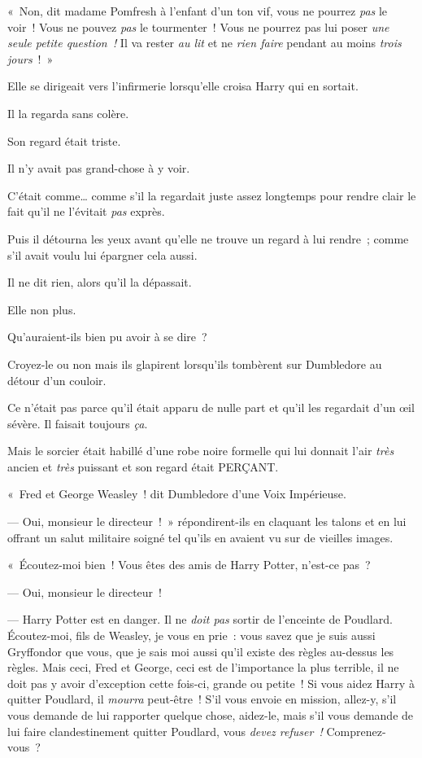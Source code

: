 
«~Non, dit madame Pomfresh à l'enfant d'un ton vif, vous ne pourrez \emph{pas} le voir~! Vous ne pouvez \emph{pas} le tourmenter~! Vous ne pourrez pas lui poser \emph{une seule petite question~!} Il va rester \emph{au lit} et ne \emph{rien faire} pendant au moins \emph{trois jours}~!~»


Elle se dirigeait vers l'infirmerie lorsqu'elle croisa Harry qui en sortait.

Il la regarda sans colère.

Son regard était triste.

Il n'y avait pas grand-chose à y voir.

C'était comme… comme s'il la regardait juste assez longtemps pour rendre clair le fait qu'il ne l'évitait \emph{pas} exprès.

Puis il détourna les yeux avant qu'elle ne trouve un regard à lui rendre~; comme s'il avait voulu lui épargner cela aussi.

Il ne dit rien, alors qu'il la dépassait.

Elle non plus.

Qu'auraient-ils bien pu avoir à se dire~?


Croyez-le ou non mais ils glapirent lorsqu'ils tombèrent sur Dumbledore au détour d'un couloir.

Ce n'était pas parce qu'il était apparu de nulle part et qu'il les regardait d'un œil sévère. Il faisait toujours \emph{ça}.

Mais le sorcier était habillé d’une robe noire formelle qui lui donnait l'air \emph{très} ancien et \emph{très} puissant et son regard était PERÇANT.

«~Fred et George Weasley~! dit Dumbledore d'une Voix Impérieuse.

--- Oui, monsieur le directeur~!~» répondirent-ils en claquant les talons et en lui offrant un salut militaire soigné tel qu'ils en avaient vu sur de vieilles images.

«~Écoutez-moi bien~! Vous êtes des amis de Harry Potter, n'est-ce pas~?

--- Oui, monsieur le directeur~!

--- Harry Potter est en danger. Il ne \emph{doit pas} sortir de l'enceinte de Poudlard. Écoutez-moi, fils de Weasley, je vous en prie~: vous savez que je suis aussi Gryffondor que vous, que je sais moi aussi qu'il existe des règles au-dessus les règles. Mais ceci, Fred et George, ceci est de l'importance la plus terrible, il ne doit pas y avoir d'exception cette fois-ci, grande ou petite~! Si vous aidez Harry à quitter Poudlard, il \emph{mourra} peut-être~! S'il vous envoie en mission, allez-y, s'il vous demande de lui rapporter quelque chose, aidez-le, mais s'il vous demande de lui faire clandestinement quitter Poudlard, vous \emph{devez refuser~!} Comprenez-vous~?

